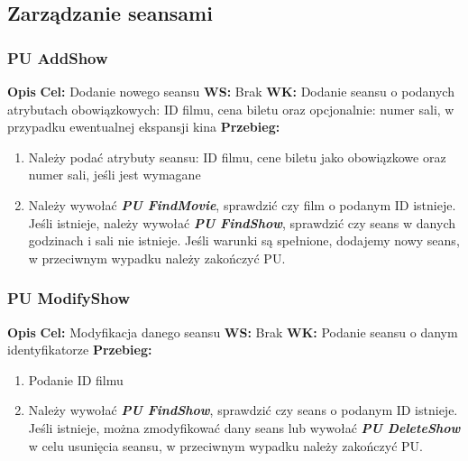 \documentclass{article}
\begin{document}
	\subsection{Zarządzanie seansami}
	\subsubsection{PU AddShow}
	\noindent \textbf{Opis}
	\newline \textbf{Cel: } Dodanie nowego seansu
	\newline \textbf{WS: } Brak
	\newline \textbf{WK: } Dodanie seansu o podanych atrybutach obowiązkowych: ID filmu, cena biletu oraz opcjonalnie: numer sali, w przypadku ewentualnej ekspansji kina
	\newline \textbf{Przebieg: }
	\begin{enumerate}
		\item Należy podać atrybuty seansu: ID filmu, cene biletu jako obowiązkowe oraz numer sali, jeśli jest wymagane
		\item Należy wywołać \textit{\textbf{PU FindMovie}}, sprawdzić czy film o podanym ID istnieje. Jeśli istnieje, należy wywołać \textit{\textbf{PU FindShow}}, sprawdzić czy seans w danych godzinach i sali nie istnieje. Jeśli warunki są spełnione, dodajemy nowy seans, w przeciwnym wypadku należy zakończyć PU.
	\end{enumerate}
	
	\subsubsection{PU ModifyShow}
	\noindent \textbf{Opis}
	\newline \textbf{Cel: } Modyfikacja danego seansu
	\newline \textbf{WS: } Brak
	\newline \textbf{WK: } Podanie seansu o danym identyfikatorze
	\newline \textbf{Przebieg: }
	\begin{enumerate}
		\item Podanie ID filmu
		\item Należy wywołać \textit{\textbf{PU FindShow}}, sprawdzić czy seans o podanym ID istnieje. Jeśli istnieje, można zmodyfikować dany seans lub wywołać \textit{\textbf{PU DeleteShow}} w celu usunięcia seansu, w przeciwnym wypadku należy zakończyć PU.
	\end{enumerate}
	
\end{document}
